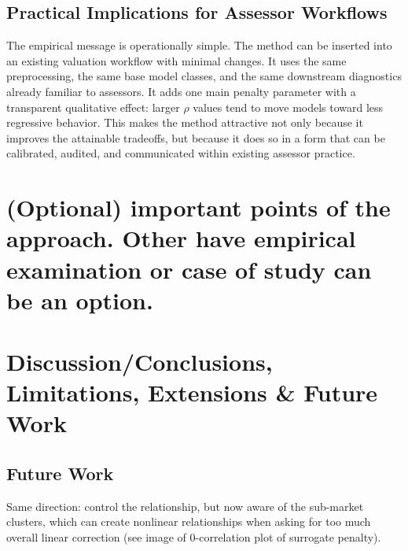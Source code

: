 \documentclass[12pt, draft]{article}
\theoremstyle{plain}
\theoremstyle{definition}
\newcommand{\1}{\mathbf{1}}
\begin{document}
\subsection{Practical Implications for Assessor Workflows}

The empirical message is operationally simple. The method can be inserted into an existing valuation workflow with minimal changes. It uses the same preprocessing, the same base model classes, and the same downstream diagnostics already familiar to assessors. It adds one main penalty parameter with a transparent qualitative effect: larger \(\rho\) values tend to move models toward less regressive behavior. This makes the method attractive not only because it improves the attainable tradeoffs, but because it does so in a form that can be calibrated, audited, and communicated within existing assessor practice.







\section{(Optional) important points of the approach. Other have empirical examination or case of study can be an option.}







\section{Discussion/Conclusions, Limitations, Extensions \& Future Work}

\subsection{Future Work}

Same direction: control the relationship, but now aware of the sub-market clusters, which can create nonlinear relationships when asking for too much overall linear correction (see image of 0-correlation plot of surrogate penalty).
\end{document}
